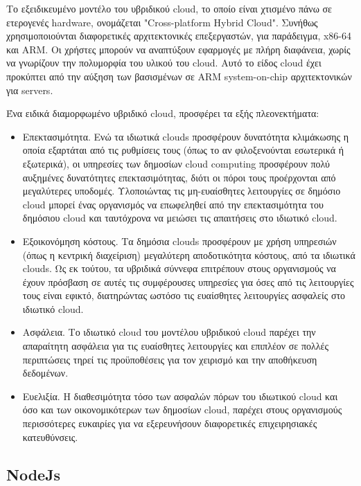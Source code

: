 		Το εξειδικευμένο μοντέλο του υβριδικού cloud, το οποίο είναι χτισμένο πάνω σε ετερογενές hardware, ονομάζεται "Cross-platform Hybrid Cloud". Συνήθως χρησιμοποιούνται διαφορετικές αρχιτεκτονικές επεξεργαστών, για παράδειγμα, x86-64 και ARM. Οι χρήστες μπορούν να αναπτύξουν εφαρμογές με πλήρη διαφάνεια, χωρίς να γνωρίζουν την πολυμορφία του υλικού του cloud. Αυτό το είδος cloud έχει προκύπτει από την αύξηση των βασισμένων σε ARM system-on-chip αρχιτεκτονικών για servers.
		
		Ένα ειδικά διαμορφωμένο υβριδικό cloud, προσφέρει τα εξής πλεονεκτήματα:
		
		\begin{itemize}
		\item Επεκτασιμότητα. Ενώ τα ιδιωτικά clouds προσφέρουν δυνατότητα κλιμάκωσης η οποία εξαρτάται από τις ρυθμίσεις τους (όπως το αν φιλοξενούνται εσωτερικά ή εξωτερικά), οι υπηρεσίες των δημοσίων cloud computing προσφέρουν πολύ αυξημένες δυνατότητες επεκτασιμότητας, διότι οι πόροι τους προέρχονται από μεγαλύτερες υποδομές. Υλοποιώντας τις μη-ευαίσθητες λειτουργίες σε δημόσιο cloud μπορεί ένας οργανισμός να επωφεληθεί από την επεκτασιμότητα του δημόσιου cloud και ταυτόχρονα να μειώσει τις απαιτήσεις στο ιδιωτικό cloud.
		
		\item Εξοικονόμηση κόστους. Τα δημόσια clouds  προσφέρουν με χρήση υπηρεσιών (όπως η κεντρική διαχείριση) μεγαλύτερη αποδοτικότητα κόστους, από  τα ιδιωτικά clouds. Ως εκ τούτου, τα υβριδικά σύννεφα επιτρέπουν στους οργανισμούς να έχουν πρόσβαση σε αυτές τις συμφέρουσες υπηρεσίες για όσες από τις λειτουργίες τους είναι εφικτό, διατηρώντας ωστόσο τις ευαίσθητες λειτουργίες ασφαλείς στο ιδιωτικό cloud.

		\item Ασφάλεια. Το ιδιωτικό cloud του μοντέλου υβριδικού cloud παρέχει την απαραίτητη ασφάλεια για τις ευαίσθητες λειτουργίες και επιπλέον σε πολλές περιπτώσεις τηρεί τις προϋποθέσεις για τον χειρισμό και την αποθήκευση δεδομένων.

		\item Ευελιξία. Η διαθεσιμότητα τόσο των ασφαλών πόρων του ιδιωτικού cloud και όσο και των οικονομικότερων των δημοσίων cloud, παρέχει στους οργανισμούς περισσότερες ευκαιρίες για να εξερευνήσουν διαφορετικές επιχειρησιακές κατευθύνσεις.
		\end{itemize} 

		\subsection{NodeJs}
	
